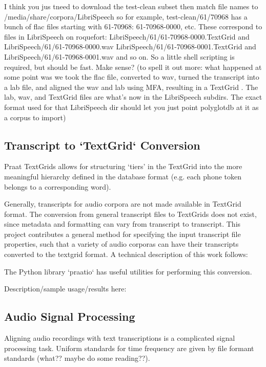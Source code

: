 \documentclass[11pt]{article}
\begin{document}
I think you jus tneed to download the test-clean subset
then match file names to /media/share/corpora/LibriSpeech
so for example, test-clean/61/70968 has a bunch of flac files starting with 61-70968: 61-70968-0000, etc.
These correspond to files in LibriSpeech on roquefort:
LibriSpeech/61/61-70968-0000.TextGrid and LibriSpeech/61/61-70968-0000.wav
 LibriSpeech/61/61-70968-0001.TextGrid and LibriSpeech/61/61-70968-0001.wav
and so on.  So a little shell scripting is required, but should be fast.  Make sense?
(to spell it out more: what happened at some point was we took the flac file, converted to wav, turned the transcript into a lab file, and aligned the wav and lab using MFA, resulting in a TextGrid .  The lab, wav, and TextGrid files are what's now in the LibriSpeech subdirs. The exact format used for that LibriSpeech dir should let you just point polyglotdb at it as a corpus to import)

\subsection{Transcript to `TextGrid` Conversion}

Praat\cite{noauthor_praat_nodate} TextGrids allows for structuring ‘tiers’ in the TextGrid into the more meaningful hierarchy defined in the database format (e.g. each phone token belongs to a corresponding word).

Generally, transcripts for audio corpora are not made available in TextGrid format. The conversion from general transcript files to TextGrids does not exist, since metadata and formatting can vary from transcript to transcript. This project contributes a general method for specifying the input transcript file properties, such that a variety of audio corporas can have their transcripts converted to the textgrid format. A technical description of this work follows:

The Python library `praatio` \cite{tim_mahrt_praatio_2016} has useful utilities for performing this conversion.

Description/sample usage/results here:

\subsection{Audio Signal Processing}

Aligning audio recordings with text transcriptions is a complicated signal processing task. Uniform standards for time frequency are given by file formant standards (what?? maybe do some reading??).
\end{document}

